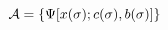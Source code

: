 \begin{equation}
{\cal A} =\{\Psi[x (\sigma); c (\sigma), b
(\sigma)]\}
 \label{eq:string-functionals}
\end{equation}

